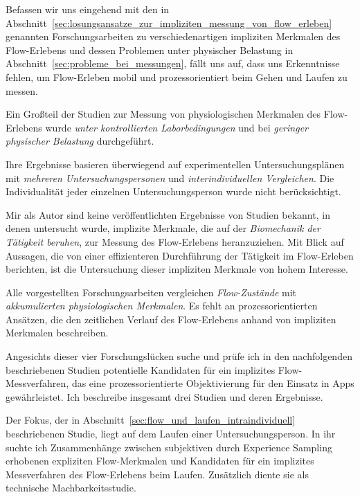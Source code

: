 

Befassen wir uns eingehend mit den in Abschnitt~\ref{sec:losungsansatze_zur_impliziten_messung_von_flow_erleben} genannten Forschungsarbeiten zu verschiedenartigen impliziten Merkmalen des Flow-Erlebens und dessen Problemen unter physischer Belastung in Abschnitt~\ref{sec:probleme_bei_messungen}, fällt uns auf, dass uns Erkenntnisse fehlen, um Flow-Erleben mobil und prozessorientiert beim Gehen und Laufen zu messen.

Ein Großteil der Studien zur Messung von physiologischen Merkmalen des Flow-Erlebens wurde \emph{unter kontrollierten Laborbedingungen} und bei \emph{geringer physischer Belastung} durchgeführt. 

Ihre Ergebnisse basieren überwiegend auf experimentellen Untersuchungsplänen mit \emph{mehreren Untersuchungspersonen} und \emph{interindividuellen Vergleichen}. Die Individualität jeder einzelnen Untersuchungsperson wurde nicht berücksichtigt.

Mir als Autor sind keine veröffentlichten Ergebnisse von Studien bekannt, in denen untersucht wurde, implizite Merkmale, die auf der \emph{Biomechanik der Tätigkeit beruhen}, zur Messung des Flow-Erlebens heranzuziehen. Mit Blick auf Aussagen, die von einer effizienteren Durchführung der Tätigkeit im Flow-Erleben berichten, ist die Untersuchung dieser impliziten Merkmale von hohem Interesse.

Alle vorgestellten Forschungsarbeiten vergleichen \emph{Flow-Zustände} mit \emph{akkumulierten physiologischen Merkmalen}. Es fehlt an prozessorientierten Ansätzen, die den zeitlichen Verlauf des Flow-Erlebens anhand von impliziten Merkmalen beschreiben.

Angesichts dieser vier Forschungslücken suche und prüfe ich in den nachfolgenden beschriebenen Studien potentielle Kandidaten für ein implizites Flow-Messverfahren, das eine prozessorientierte Objektivierung für den Einsatz in Apps gewährleistet. Ich beschreibe insgesamt drei Studien und deren Ergebnisse.

Der Fokus, der in Abschnitt~\ref{sec:flow_und_laufen_intraindividuell} beschriebenen Studie, liegt auf dem Laufen einer Untersuchungsperson. In ihr suchte ich Zusammenhänge zwischen subjektiven durch Experience Sampling erhobenen expliziten Flow-Merkmalen und Kandidaten für ein implizites Messverfahren des Flow-Erlebens beim Laufen. Zusätzlich diente sie als technische Machbarkeitsstudie. 

